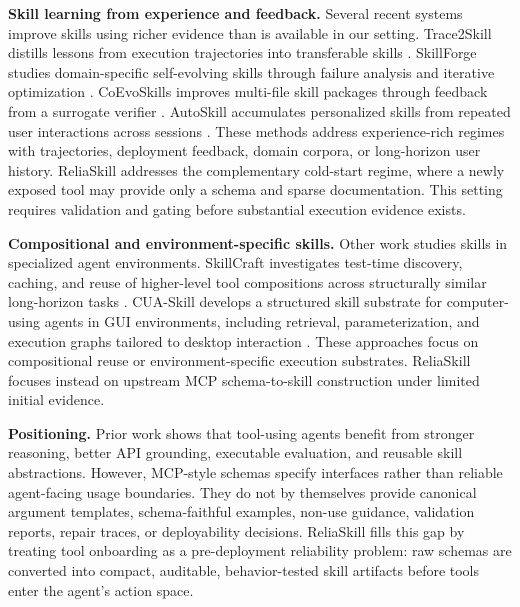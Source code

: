 \documentclass[11pt]{article}
\newcommand{\method}{ReliaSkill}
\begin{document}
\textbf{Skill learning from experience and feedback.}
Several recent systems improve skills using richer evidence than is available in our setting. Trace2Skill distills lessons from execution trajectories into transferable skills \citep{ni2026trace2skilldistilltrajectorylocallessons}. SkillForge studies domain-specific self-evolving skills through failure analysis and iterative optimization \citep{liu2026skillforgeforgingdomainspecificselfevolving}. CoEvoSkills improves multi-file skill packages through feedback from a surrogate verifier \citep{zhang2026coevoskillsselfevolvingagentskills}. AutoSkill accumulates personalized skills from repeated user interactions across sessions \citep{yang2026autoskillexperiencedrivenlifelonglearning}. These methods address experience-rich regimes with trajectories, deployment feedback, domain corpora, or long-horizon user history. \method{} addresses the complementary cold-start regime, where a newly exposed tool may provide only a schema and sparse documentation. This setting requires validation and gating before substantial execution evidence exists.

\textbf{Compositional and environment-specific skills.}
Other work studies skills in specialized agent environments. SkillCraft investigates test-time discovery, caching, and reuse of higher-level tool compositions across structurally similar long-horizon tasks \citep{chen2026skillcraftllmagentslearn}. CUA-Skill develops a structured skill substrate for computer-using agents in GUI environments, including retrieval, parameterization, and execution graphs tailored to desktop interaction \citep{chen2026cuaskilldevelopskillscomputer}. These approaches focus on compositional reuse or environment-specific execution substrates. \method{} focuses instead on upstream MCP schema-to-skill construction under limited initial evidence.

\textbf{Positioning.}
Prior work shows that tool-using agents benefit from stronger reasoning, better API grounding, executable evaluation, and reusable skill abstractions. However, MCP-style schemas specify interfaces rather than reliable agent-facing usage boundaries. They do not by themselves provide canonical argument templates, schema-faithful examples, non-use guidance, validation reports, repair traces, or deployability decisions. \method{} fills this gap by treating tool onboarding as a pre-deployment reliability problem: raw schemas are converted into compact, auditable, behavior-tested skill artifacts before tools enter the agent's action space.
\end{document}
